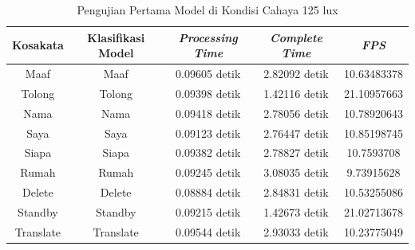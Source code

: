 \begin{longtable}{|c|c|c|c|c|}
  \caption{Pengujian Pertama Model di Kondisi Cahaya 125 lux}
  \label{tb:prediksiterang1}                                   \\
  \hline
  \rowcolor[HTML]{C0C0C0}
  \textbf{Kosakata} & \textbf{Klasifikasi Model} & \textbf{\emph{Processing Time}} & \textbf{\emph{Complete Time}} & \textbf{\emph{FPS}}\\
  \hline
  Maaf              & Maaf                        & 0.09605 detik                           & 2.82092 detik                                 & 10.63483378\\
  Tolong            & Tolong                      & 0.09398 detik                           & 1.42116 detik                                 & 21.10957663\\
  Nama              & Nama                        & 0.09418 detik                           & 2.78056 detik                                 & 10.78920643\\
  Saya              & Saya                        & 0.09123 detik                           & 2.76447 detik                                 & 10.85198745\\
  Siapa             & Siapa                       & 0.09382 detik                           & 2.78827 detik                                 & 10.7593708\\
  Rumah             & Rumah                       & 0.09245 detik                           & 3.08035 detik                                 & 9.73915628\\
  Delete            & Delete                      & 0.08884 detik                           & 2.84831 detik                                 & 10.53255086\\
  Standby           & Standby                     & 0.09215 detik                           & 1.42673 detik                                 & 21.02713678\\
  Translate         & Translate                   & 0.09544 detik                           & 2.93033 detik                                 & 10.23775049\\
  \hline
\end{longtable}


